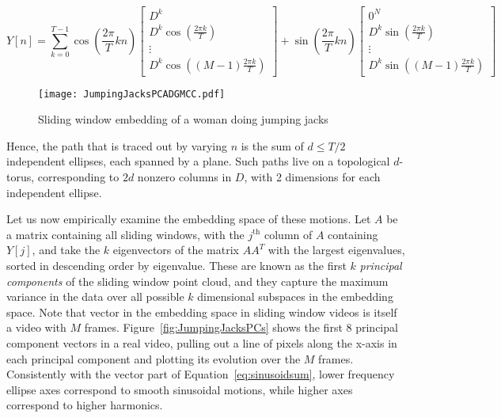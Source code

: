 \documentclass[a4paper,UKenglish]{lipics-v2016}
\begin{document}
\small
\begin{equation}
Y[n] = \sum_{k = 0}^{T-1} \cos \left( \frac{2 \pi}{T} k n \right) \left[ \begin{array}{c} D^k \\ D^k \cos \left( \frac{2 \pi k}{T} \right) \\ \vdots \\ D^k \cos \left( (M-1) \frac{2 \pi k}{T} \right) \end{array} \right] + \sin \left( \frac{2 \pi}{T} k n \right) \left[ \begin{array}{c} 0^N \\ D^k \sin \left( \frac{2 \pi k}{T} \right) \\ \vdots \\ D^k \sin \left( (M-1) \frac{2 \pi k}{T} \right) \end{array} \right]
\label{eq:sinusoidsum}
\end{equation}


\begin{figure}[]
	\centering
	\texttt{[image: JumpingJacksPCADGMCC.pdf]}
	\caption{Sliding window embedding of a woman doing jumping jacks}
	\label{fig:JumpingJacks}
\end{figure}

Hence, the path that is traced out by varying $n$ is the sum of $d \leq T/2$ independent ellipses, each spanned by a plane.  Such paths live on a topological $d$-torus, corresponding to $2d$ nonzero columns in $D$, with 2 dimensions for each independent ellipse.  

Let us now empirically examine the embedding space of these motions.  Let $A$ be a matrix containing all sliding windows, with the $j^{\text{th}}$ column of $A$ containing $Y[j]$, and take the $k$ eigenvectors of the matrix $AA^T$ with the largest eigenvalues, sorted in descending order by eigenvalue.  These are known as the first $k$ {\em principal components} of the sliding window point cloud, and they capture the maximum variance in the data over all possible $k$ dimensional subspaces in the embedding space.  Note that vector in the embedding space in sliding window videos is itself a video with $M$ frames.  Figure~\ref{fig:JumpingJacksPCs} shows the first 8 principal component vectors in a real video, pulling out a line of pixels along the x-axis in each principal component and plotting its evolution over the $M$ frames.  Consistently with the vector part of Equation~\ref{eq:sinusoidsum}, lower frequency ellipse axes correspond to smooth sinusoidal motions, while higher axes correspond to higher harmonics.
\end{document}
